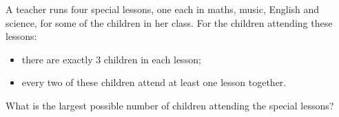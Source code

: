 A teacher runs four special lessons, one each in maths, music, English and science, for some of the children in her class. For the children attending these lessons:
\begin{itemize}
\item there are exactly $3$ children in each lesson;
\item every two of these children attend at least one lesson together.
\end{itemize}
What is the largest possible number of children attending the special lessons?
